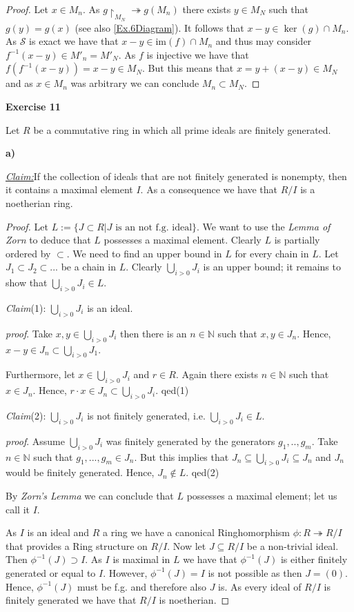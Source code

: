 \documentclass{article}
\newcommand{\contradiction}{\lightning}
\newcommand{\N}{\mathbb{N}}
\newcommand{\im}{\mathrm{im}}
\newcommand{\inv}[1]{{#1}^{-1}}
\newcommand{\claim}
{\underline{\textit{Claim:}}\hspace{0,2cm}}
\newcommand{\subclaim}[1]
{

	\vspace*{0,2cm}
	\textit{Claim}({#1}):
}
\newcommand{\subqed}[1]{\hfill\textsf{qed}({#1})}
\newcommand{\subproof}{

\noindent\textit{proof}.\hspace{0,1cm}
}
\newcommand{\aufgabe}[1]{
{
	\vspace*{0.5cm}
	\noindent\textsf{\textbf{Exercise #1}}
	\vspace*{0.2cm}

}
}
\newcommand{\teilaufgabe}[1]{
{       

	\noindent\hspace*{0,1 cm}\textbf{#1)}
}
}
\theoremstyle{definition}
\theoremstyle{plain}
\theoremstyle{remark}
\begin{document}
\begin{proof}
Let $x\in M_n$. As $g\restriction_{M_N} \twoheadrightarrow g(M_n)$ there exists $y\in M_N$ such that $g(y) = g(x)$ (see also \cref{Ex.6Diagram}). It follows that $x-y\in \ker(g)\cap M_n$. As $\mathcal{S}$ is exact we have that $x-y\in\im(f)\cap M_n$ and thus may consider $f^{-1}(x-y)\in M'_n = M'_N$. As $f$ is injective we have that $f(\inv{f}(x-y))= x-y \in M_N$. But this means that $x = y + (x-y) \in M_N$ and as $x\in M_n$ was arbitrary we can conclude $M_n\subset M_N$.
\end{proof}

\aufgabe{11}
Let $R$ be a commutative ring in which all prime ideals are finitely generated.
\teilaufgabe{a} \claim If the collection of ideals that are not finitely generated is nonempty, then it contains a maximal element $I$. As a consequence we have that $R/I$ is a noetherian ring.
\begin{proof}
	Let $L:=\{J\subset R | J \text{ is an not f.g. ideal}\}$. We want to use the \emph{Lemma of Zorn} to deduce that $L$ possesses a maximal element. Clearly $L$ is partially ordered by $\subset$. We need to find an upper bound in $L$ for every chain in $L$. Let $J_1\subset J_2 \subset ...$ be a chain in $L$. Clearly $\bigcup_{i>0}J_i$ is an upper bound; it remains to show that $\bigcup_{i>0}J_i\in L$.  
	\subclaim1 $\bigcup_{i>0}J_i$  is an ideal.
	\subproof Take $x,y\in \bigcup_{i>0}J_i$ then there is an $n\in \N$ such that $x,y\in J_n$. Hence, $x-y\in J_n \subset \bigcup_{i>0}J_1$.
	
	Furthermore, let $x\in \bigcup_{i>0}J_i$ and $r\in R$. Again there exists $n\in \N$ such that $x\in J_n$. Hence, $r\cdot x \in J_n\subset \bigcup_{i>0}J_i$. \subqed1
	\subclaim2 $\bigcup_{i>0}J_i$ is not finitely generated, i.e. $\bigcup_{i>0}J_i\in L$.
	\subproof Assume $\bigcup_{i>0}J_i$ was finitely generated by the generators $g_1,..,g_m$. Take $n\in\N$ such that $g_1,...,g_m \in J_n$. But this implies that $J_n\subseteq\bigcup_{i>0}J_i\subseteq J_n$ and $J_n$ would be finitely generated. Hence, $J_n\notin L$. \contradiction \subqed2

	By \emph{Zorn's Lemma} we can conclude that $L$ possesses a maximal element; let us call it $I$.

	As $I$ is an ideal and $R$ a ring we have a canonical Ringhomorphism $\phi:R\twoheadrightarrow R/I$ that provides a Ring structure on $R/I$.
	Now let $J\subseteq R/I$ be a non-trivial ideal. Then $\inv{\phi}(J) \supset I$. As $I$ is maximal in $L$ we have that $\inv{\phi}(J)$ is either finitely generated or equal to $I$. However, $\inv{\phi}(J)=I$ is not possible as then $J = (0)$. Hence, $\inv{\phi}(J)$ must be f.g. and therefore also $J$ is. 
	As every ideal of $R/I$ is finitely generated we have that $R/I$ is noetherian.
\end{proof}
\end{document}
